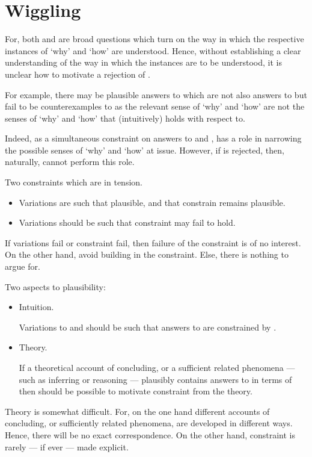 \section{Wiggling}
\label{cha:var:sec:wiggling}

\begin{note}
  For, both \qWhy{} and \qHow{} are broad questions which turn on the way in which the respective instances of `why' and `how' are understood.
  Hence, without establishing a clear understanding of the way in which the instances are to be understood, it is unclear how to motivate a rejection of \issueInclusion{}.

  For example, there may be plausible answers to \qWhy{} which are not also answers to \qHow{} but fail to be counterexamples to \issueInclusion{} as the relevant sense of `why' and `how' are not the senses of `why' and `how' that \issueInclusion{} (intuitively) holds with respect to.

  Indeed, as a simultaneous constraint on answers to \qWhy{} and \qHow{}, \issueInclusion{} has a role in narrowing the possible senses of `why' and `how' at issue.
  However, if \issueInclusion{} is rejected, then, naturally, \issueInclusion{} cannot perform this role.
\end{note}

\begin{note}
  Two constraints which are in tension.
  \begin{itemize}
  \item
    Variations are such that plausible, and that constrain remains plausible.
  \item
    Variations should be such that constraint may fail to hold.
  \end{itemize}

  If variations fail or constraint fail, then failure of the constraint is of no interest.
  On the other hand, avoid building in the constraint.
  Else, there is nothing to argue for.

  Two aspects to plausibility:
  \begin{itemize}
  \item
    Intuition.

    Variations to \qWhy{} and \qHow{} should be such that answers to \qWhy{} are constrained by \qHow{}.
  \item
    Theory.

    If a theoretical account of concluding, or a sufficient related phenomena --- such as inferring or reasoning --- plausibly contains answers to \qWhy{} in terms of \qHow{} then should be possible to motivate constraint from the theory.
  \end{itemize}

  Theory is somewhat difficult.
  For, on the one hand different accounts of concluding, or sufficiently related phenomena, are developed in different ways.
  Hence, there will be no exact correspondence.
  On the other hand, constraint is rarely --- if ever --- made explicit.
\end{note}

